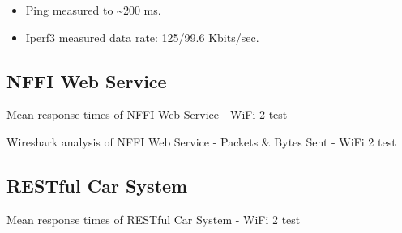 \begin{appendices}
\begin{itemize}
	\item Ping measured to \textasciitilde 200 ms.
	\item Iperf3 measured data rate: 125/99.6 Kbits/sec.
\end{itemize}

\subsection{NFFI Web Service}

\begin{table}[H]

\caption{Mean response times of NFFI Web Service - WiFi 2 test}
\end{table}

\begin{table}[H]

\caption{Wireshark analysis of NFFI Web Service - Packets \& Bytes Sent - WiFi 2 test}
\end{table}

\subsection{RESTful Car System}

\begin{table}[H]

\caption{Mean response times of RESTful Car System - WiFi 2 test}
\end{table}


\end{appendices}
